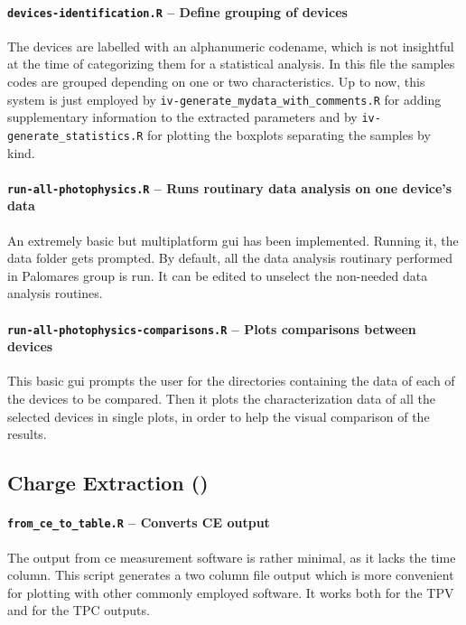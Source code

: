 		\paragraph{\texttt{devices-identification.R} -- Define grouping of devices}
		The devices are labelled with an alphanumeric codename, which is not insightful at the time of categorizing them for a statistical analysis.
		In this file the samples codes are grouped depending on one or two characteristics.
		Up to now, this system is just employed by \texttt{iv-generate\_mydata\_with\_comments.R} for adding supplementary information to the extracted parameters and by \texttt{iv-generate\_statistics.R} for plotting the boxplots separating the samples by kind.

		\paragraph{\texttt{run-all-photophysics.R} -- Runs routinary data analysis on one device's data}
		An extremely basic but multiplatform \gls{gui} has been implemented.
		Running it, the data folder gets prompted.
		By default, all the data analysis routinary performed in Palomares group is run.
		It can be edited to unselect the non-needed data analysis routines.
		
		\paragraph{\texttt{run-all-photophysics-comparisons.R} -- Plots comparisons between devices}
		This basic \gls{gui} prompts the user for the directories containing the data of each of the devices to be compared.
		Then it plots the characterization data of all the selected devices in single plots, in order to help the visual comparison of the results.
		


	\subsection{Charge Extraction ()}\label{r_ce}

		\paragraph{\texttt{from\_ce\_to\_table.R} -- Converts CE output}
		The output from \gls{ce} measurement software is rather minimal, as it lacks the time column.
		This script generates a two column file output which is more convenient for plotting with other commonly employed software.
		It works both for the TPV and for the TPC outputs.
		
